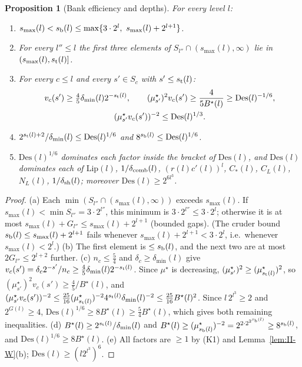 \documentclass[10pt]{amsart}
\newtheorem{proposition}[theorem]{Proposition}
\theoremstyle{definition}
\theoremstyle{remark}
\begin{document}
\begin{proposition}[Bank efficiency and depths]\label{prop:II-bank}
For every level $l$:
\begin{enumerate}
\item[(a)] $s_{\max}(l)<s_{\rm b}(l)\le\max\{3\cdot2^l,\ s_{\max}(l)+
2^{l+1}\}$.
\item[(b)] For every $l''\le l$ the first three elements of
$S_{l''}\cap(s_{\max}(l),\infty)$ lie in $(s_{\max}(l),s_{\rm t}(l)]$.
\item[(c)] For every $c\le l$ and every $s'\in S_c$ with $s'\le
s_{\rm t}(l)$:
\[
 \begin{gathered}
 v_c(s')\ge\tfrac45\delta_{\min}(l)2^{-s_{\rm t}(l)},\qquad
 (\mu^\star_{s'})^2v_c(s')\ge\frac4{5B^\star(l)}\ge\mathrm{Des}(l)^{-1/6},\\
 (\mu^\star_{s'}v_c(s'))^{-2}\le\mathrm{Des}(l)^{1/3}.
 \end{gathered}
\]
\item[(d)] $2^{s_{\rm t}(l)+2}/\delta_{\min}(l)\le\mathrm{Des}(l)^{1/6}$ and
$8^{s_{\rm b}(l)}\le\mathrm{Des}(l)^{1/6}$.
\item[(e)] $\mathrm{Des}(l)^{1/6}$ dominates each factor inside the
bracket of $\mathrm{Des}(l)$, and $\mathrm{Des}(l)$ dominates each of
$\mathrm{Lip}(l)$, $1/\delta_{\rm comb}(l)$, $(r(l)c'(l))^l$, $C_*(l)$,
$C_L(l)$, $N_L(l)$, $1/\delta_{\rm sh}(l)$; moreover
$\mathrm{Des}(l)\ge2^{6l^3}$.
\end{enumerate}
\end{proposition}

\begin{proof}
(a) Each $\min(S_{l''}\cap(s_{\max}(l),\infty))$ exceeds $s_{\max}(l)$.  If
$s_{\max}(l)<\min S_{l''}=3\cdot2^{l''}$, this minimum is $3\cdot2^{l''}\le
3\cdot2^l$; otherwise it is at most $s_{\max}(l)+G_{l''}\le s_{\max}(l)+
2^{l+1}$ (bounded gaps).  (The cruder bound $s_{\rm b}(l)\le s_{\max}(l)+
2^{l+1}$ fails whenever $s_{\max}(l)+2^{l+1}<3\cdot2^{l}$, i.e.\ whenever
$s_{\max}(l)<2^l$.)  (b) The first
element is $\le s_{\rm b}(l)$, and the next two are at most $2G_{l''}\le
2^{l+2}$ further.  (c) $n_c\le\frac54$ and $\delta_c\ge\delta_{\min}(l)$
give $v_c(s')=\delta_c2^{-s'}/n_c\ge\frac45\delta_{\min}(l)2^{-s_{\rm t}(l)}$.
Since $\mu^\star$ is decreasing, $(\mu^\star_{s'})^2\ge(\mu^\star_{s_{\rm
t}(l)})^2$, so $(\mu^\star_{s'})^2v_c(s')\ge\frac45/B^\star(l)$, and
$(\mu^\star_{s'}v_c(s'))^{-2}\le\frac{25}{16}(\mu^\star_{s_{\rm t}(l)})^{-2}
4^{s_{\rm t}(l)}\delta_{\min}(l)^{-2}\le\frac{25}{16}B^\star(l)^2$.  Since
$l\,2^{l^3}\ge2$ and $2^{G(l)}\ge4$, $\mathrm{Des}(l)^{1/6}\ge8B^\star(l)
\ge\frac54B^\star(l)$, which gives both remaining inequalities.  (d)
$B^\star(l)\ge2^{s_{\rm t}(l)}/\delta_{\min}(l)$ and
$B^\star(l)\ge(\mu^\star_{s_{\rm b}(l)})^{-2}=2^{2\cdot2^{2^{s_{\rm b}(l)}}}
\ge8^{s_{\rm b}(l)}$, and $\mathrm{Des}(l)^{1/6}\ge8B^\star(l)$.  (e) All
factors are $\ge1$ by (K1) and Lemma~\ref{lem:II-W}(b);
$\mathrm{Des}(l)\ge(l2^{l^3})^6$.
\end{proof}
\end{document}
